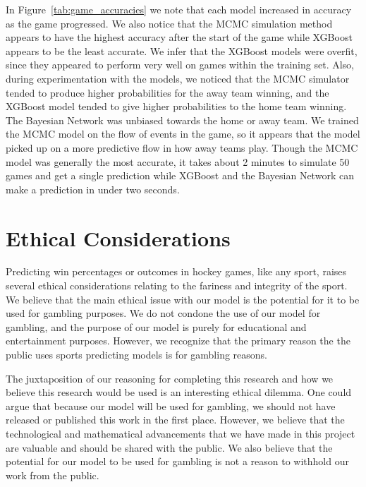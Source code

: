 \documentclass[11pt]{article}
\begin{document}

In Figure~\ref{tab:game_accuracies} we note that each model increased in accuracy as the game progressed. We also notice that the MCMC simulation method appears to have the highest accuracy after the start of the game while XGBoost appears to be the least accurate. We infer that the XGBoost models were overfit, since they appeared to perform very well on games within the training set. Also, during experimentation with the models, we noticed that the MCMC simulator tended to produce higher probabilities for the away team winning, and the XGBoost model tended to give higher probabilities to the home team winning. The Bayesian Network was unbiased towards the home or away team. We trained the MCMC model on the flow of events in the game, so it appears that the model picked up on a more predictive flow in how away teams play. Though the MCMC model was generally the most accurate, it takes about 2 minutes to simulate 50 games and get a single prediction while XGBoost and the Bayesian Network can make a prediction in under two seconds.

\section{Ethical Considerations}
Predicting win percentages or outcomes in hockey games, like any sport, raises several ethical considerations relating to the fariness and integrity of the sport. We believe that the main ethical issue with our model is the potential for it to be used for gambling purposes. 
We do not condone the use of our model for gambling, and the purpose of our model is purely for educational and entertainment purposes. However, we recognize that the primary reason the the public uses sports predicting models is for gambling reasons.

The juxtaposition of our reasoning for completing this research and how we believe this research would be used is an interesting ethical dilemma. 
One could argue that because our model will be used for gambling, we should not have released or published this work in the first place. 
However, we believe that the technological and mathematical advancements that we have made in this project are valuable and should be shared with the public. 
We also believe that the potential for our model to be used for gambling is not a reason to withhold our work from the public.
\end{document}
